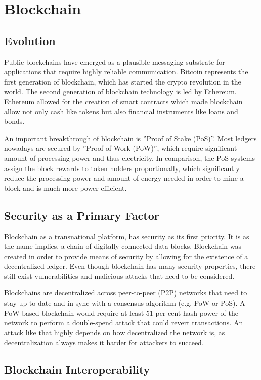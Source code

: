 \section{Blockchain}
\subsection{Evolution}

Public blockchains have emerged as a plausible messaging substrate for applications that require highly reliable communication. Bitcoin represents the first generation of blockchain, which has started the crypto revolution in the world. The second generation of blockchain technology is led by Ethereum. Ethereum allowed for the creation of smart contracts which made blockchain allow not only cash like tokens but also financial instruments like loans and bonds.

An important breakthrough of blockchain is ”Proof of Stake (PoS)”. Most ledgers nowadays are secured by ”Proof of Work (PoW)”, which require significant amount of processing power and thus electricity. In comparison, the PoS systems assign the block rewards to token holders proportionally, which significantly reduce the processing power and amount of energy needed in order to mine a block and is much more power efficient.

\subsection{Security as a Primary Factor}
 
Blockchain as a transnational platform, has security as its first priority. It is as the name implies, a chain of digitally connected data blocks. Blockchain was created in order to provide means of security by allowing for the existence of a decentralized ledger. Even though blockchain has many security properties, there still exist vulnerabilities and malicious attacks that need to be considered.

Blockchains are decentralized across peer-to-peer (P2P) networks that need to stay up to date and in sync with a consensus algorithm (e.g. PoW or PoS). A PoW based blockchain would require at least 51 per cent hash power of the network to perform a double-spend attack that could revert transactions. An attack like that highly depends on how decentralized the network is, as decentralization always makes it harder for attackers to succeed.

\subsection{Blockchain Interoperability}

